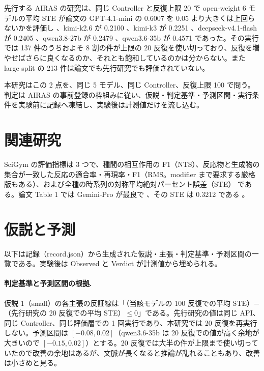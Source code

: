 \documentclass{article}
\providecommand{\unverified}[1]{#1}
\begin{document}
先行する AIRAS の研究は、同じ Controller と反復上限 20 で open-weight 6 モデルの平均 STE が論文の GPT-4.1-mini の 0.6007 を 0.05 より大きくは上回らないかを評価し \cite[s3.p1]{scigymrikyuopenmodels-2026-scigym}、kimi-k2.6 が \unverified{0.2100} \cite[s3.p2]{scigymrikyuopenmodels-2026-scigym}、kimi-k3 が \unverified{0.2251} \cite[s3.p3]{scigymrikyuopenmodels-2026-scigym}、deepseek-v4.1-flash が \unverified{0.2405} \cite[s3.p4]{scigymrikyuopenmodels-2026-scigym}、qwen3.8-27b が \unverified{0.2479} \cite[s3.p5]{scigymrikyuopenmodels-2026-scigym}、qwen3.6-35b が \unverified{0.4571} \cite[s3.p6]{scigymrikyuopenmodels-2026-scigym} であった。その実行では 137 件のうちおよそ 8 割の件が上限の 20 反復を使い切っており、反復を増やせばさらに良くなるのか、それとも飽和しているのかは分からない。また large split の 213 件は論文でも先行研究でも評価されていない。

本研究はこの 2 点を、同じ 5 モデル、同じ Controller、反復上限 100 で問う。判定は AIRAS の事前登録の枠組みに従い、仮説・判定基準・予測区間・実行条件を実験前に記録へ凍結し、実験後は計測値だけを流し込む。

\section{関連研究}
\label{sec:related}
SciGym \citep{duan-2025-measuring} の評価指標は 3 つで、種間の相互作用の F1（NTS）、反応物と生成物の集合が一致した反応の適合率・再現率・F1（RMS。modifier まで要求する厳格版もある）\cite[s1.p7]{duan-2025-measuring}、および全種の時系列の対称平均絶対パーセント誤差（STE）\cite[s1.p8]{duan-2025-measuring} である。論文 Table 1 では Gemini-Pro が最良で \cite[s1.p6]{duan-2025-measuring}、その STE は \unverified{0.3212} である \cite[s1.p5]{duan-2025-measuring}。

\section{仮説と予測}
\label{sec:hypothesis}
以下は記録（record.json）から生成された仮説・主張・判定基準・予測区間の一覧である。実験後は Observed と Verdict が計測値から埋められる。



\paragraph{判定基準と予測区間の根拠.}
仮説 1（small）の各主張の反証線は「（当該モデルの 100 反復での平均 STE）$-$（先行研究の 20 反復での平均 STE）$\le 0$」である。先行研究の値は同じ API、同じ Controller、同じ評価層での 1 回実行であり、本研究では 20 反復を再実行しない。予測区間は $[-0.08, 0.02]$（qwen3.6-35b は 20 反復での値が高く余地が大きいので $[-0.15, 0.02]$）とする。20 反復では大半の件が上限まで使い切っていたので改善の余地はあるが、文脈が長くなると推論が乱れることもあり、改善は小さめと見る。
\end{document}
